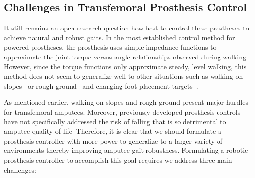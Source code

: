 \subsection{Challenges in Transfemoral Prosthesis Control}
It still remains an open research question how best to control these prostheses
to achieve natural and robust gaits. In the most established control method for
powered prostheses, the prosthesis uses simple impedance functions to
approximate the joint torque versus angle relationships observed during
walking~\citep{sup2009preliminary}. However, since the torque functions only
approximate steady, level walking, this method does not seem to generalize well
to other situations such as walking on slopes~\citep{sup2011upslope} or rough
ground~\citep{thatte2016toward} and changing foot placement
targets~\citep{schepelmann2016evaluation}. 

As mentioned earlier, walking on slopes and rough ground present major hurdles
for transfemoral amputees. Moreover, previously developed prosthesis controls
have not specifically addressed the risk of falling that is so detrimental to
amputee quality of life. Therefore, it is clear that we should formulate a
prosthesis controller with more power to generalize to a larger variety of
environments thereby improving amputee gait robustness. Formulating a robotic
prosthesis controller to accomplish this goal requires we address three main
challenges:

